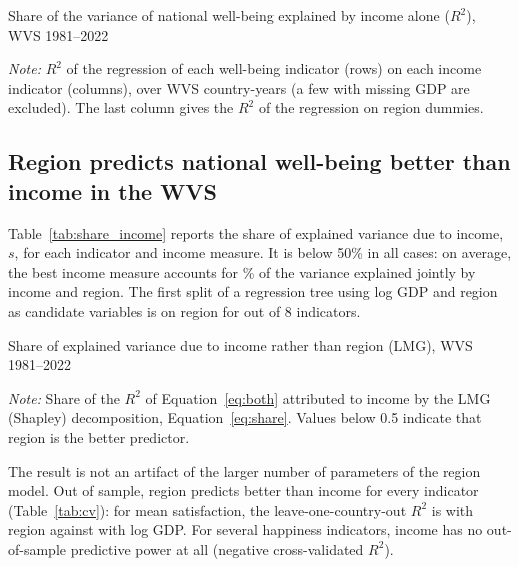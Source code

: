 \begin{table}[htbp]
    \centering
    \caption{Share of the variance of national well-being explained by income alone ($R^2$), WVS 1981--2022}\label{tab:r2_income}
    \begin{adjustbox}{max width=\textwidth}
    
    \end{adjustbox}
    \begin{minipage}{\textwidth}\footnotesize \textit{Note:} $R^2$ of the regression of each well-being indicator (rows) on each income indicator (columns), over \nWVSCountryYears WVS country-years (a few with missing GDP are excluded). The last column gives the $R^2$ of the regression on region dummies.\end{minipage}
\end{table}

\subsection{Region predicts national well-being better than income in the WVS}\label{subsec:region_wvs}

Table~\ref{tab:share_income} reports the share of explained variance due to income, $s$, for each indicator and income measure. It is below 50\% in all cases: on average, the best income measure accounts for \meanShareIncomeBest\% of the variance explained jointly by income and region. The first split of a regression tree using log GDP and region as candidate variables is on region for \treeRegionFirst out of 8 indicators.

\begin{table}[htbp]
    \centering
    \caption{Share of explained variance due to income rather than region (LMG), WVS 1981--2022}\label{tab:share_income}
    \begin{adjustbox}{max width=\textwidth}
    
    \end{adjustbox}
    \begin{minipage}{\textwidth}\footnotesize \textit{Note:} Share of the $R^2$ of Equation~\eqref{eq:both} attributed to income by the LMG (Shapley) decomposition, Equation~\eqref{eq:share}. Values below 0.5 indicate that region is the better predictor.\end{minipage}
\end{table}

The result is not an artifact of the larger number of parameters of the region model. Out of sample, region predicts better than income for every indicator (Table~\ref{tab:cv}): for mean satisfaction, the leave-one-country-out $R^2$ is \cvRegionSatisfiedMean with region against \cvIncomeSatisfiedMean with log GDP. For several happiness indicators, income has no out-of-sample predictive power at all (negative cross-validated $R^2$).


